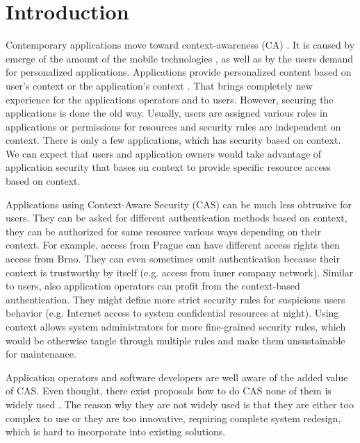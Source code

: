 \documentclass{sig-alternate}
\begin{document}



\section{Introduction}
Contemporary applications move toward context-awareness (CA) \cite{context,tomas1}. It is caused by emerge of the amount of the mobile technologies \cite{mobilecontext}, as well as by the users demand for personalized applications. Applications provide personalized content based on user's context or the application's context \cite{personalizedcontext}. That brings completely new experience for the applications operators and to users. However, securing the applications is done the old way. Usually, users are assigned various roles in applications or permissions for resources and security rules are independent on context. There is only a few applications, which has security based on context. We can expect that users and application owners would take advantage of application security that bases on context to provide specific resource access based on context.

Applications using Context-Aware Security (CAS) can be much less obtrusive for users. They can be asked for different authentication methods based on context, they can be authorized for same resource various ways depending on their context. For example, access from Prague can have different access rights then access from Brno. They can even sometimes omit authentication because their context is trustworthy by itself (e.g. access from inner company network). Similar to users, also application operators can profit from the context-based authentication. They might define more strict security rules for suspicious users behavior (e.g. Internet access to system confidential resources at night). Using context allows system administrators for more fine-grained security rules, which would be otherwise tangle through multiple rules and make them unsustainable for maintenance. 

Application operators and software developers are well aware of the added value of CAS. Even thought, there exist proposals how to do CAS none of them is widely used \cite{ubiscom,envroles,hung,contextawarerbac,genericcontext,contextAwareMobile,grbac,xorbac,contextroles,eacl,contextaccess,wendong}. The reason why they are not widely used is that they are either too complex to use or they are too innovative, requiring complete system redesign, which is hard to incorporate into existing solutions.
\end{document}
